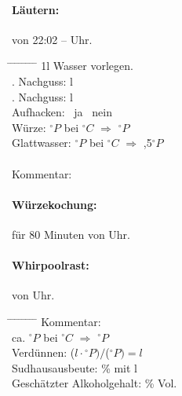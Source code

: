 \documentclass[12pt,oneside,a4paper]{scrartcl}
\begin{document}
{\paragraph{Läutern:} von 22:02 -- Uhr.
	\begin{tabbing}
		\hspace{1cm} \= \hspace{1cm} \= \hspace{1cm} \= \hspace{1cm} \= \hspace{1cm} \=\hspace{1cm} \=\hspace{1cm} \=\hspace{1cm} \= \kill
		\> 1l Wasser vorlegen.\\
		\> . Nachguss: \> \> 5 l\\
		\> . Nachguss: \>  l\\
		\> \> \> Aufhacken: \> \> \CheckedBox \ ja \> \> \Square \ nein\\
		\> Würze: \> \> \> $^\circ P$ \> bei \>$^\circ C$ \> $\Rightarrow$ \> $^\circ P$\\
		\> Glattwasser: \> \> \>$^\circ P$ \> bei \> $^\circ C$ \> $\Rightarrow$ ,5$^\circ P$\\\\
		\> Kommentar: \>\>\> \\
	\end{tabbing}
%
\paragraph{Würzekochung:} für 80 Minuten von  Uhr.\\
\paragraph{Whirpoolrast:} von  Uhr.
	\begin{tabbing}
		\hspace{1cm} \= \hspace{1cm} \= \hspace{1cm} \= \hspace{1cm} \= \hspace{1cm} \= \hspace{1cm} \= \hspace{1cm} \= \hspace{1cm} \= \kill
		\> Kommentar: \>\>\> \\
		\> \> \> ca. $^\circ P$ \> \> bei \> $^\circ C$ \> $\Rightarrow$ \> $^\circ P$\\
		\> \> Verdünnen: \> \> \> \> \> ($l \cdot$$ ^\circ P)/$($^\circ P)= l$\\
		\> \> Sudhausausbeute: \> \> \> \> \>  \% mit l\\
		\> \> Geschätzter Alkoholgehalt: \> \> \> \> \> \% Vol.
	\end{tabbing}
%
}
\end{document}
